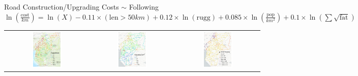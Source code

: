 \documentclass[aspectratio=169,xcolor=dvipsnames]{beamer}
\begin{document}
\begin{frame}{Road Construction/Upgrading Costs $\sim$ Following \citet{collier2016cost}} 
\small $\ln\left(\frac{\text{cost}}{km}\right) = \ln(X) -0.11 \times (\text{len} > 50km) + 0.12 \times \ln(\text{rugg}) + 0.085 \times \ln(\frac{\text{pop}}{km^2}) + 0.1 \times \ln(\sum\sqrt{\text{fat}})$ 
\begin{adjustbox}{center}
\begin{tabular}{@{}c@{}c@{}@{}c@{}}
\includegraphics[width=0.38\textwidth, trim= {1cm 0 1cm 0}, clip]{"../figures/trans_CEMAC_network_rugg.pdf"} & 
\includegraphics[width=0.38\textwidth, trim= {1cm 0 1cm 0}, clip]{"../figures/trans_CEMAC_network_pop_wpop_km2.pdf"} & 
\includegraphics[width=0.38\textwidth, trim= {1cm 0 1cm 0}, clip]{"../figures/trans_CEMAC_network_ACLED_edges_add.pdf"}
\end{tabular}
\end{adjustbox}
\end{frame}
\end{document}
